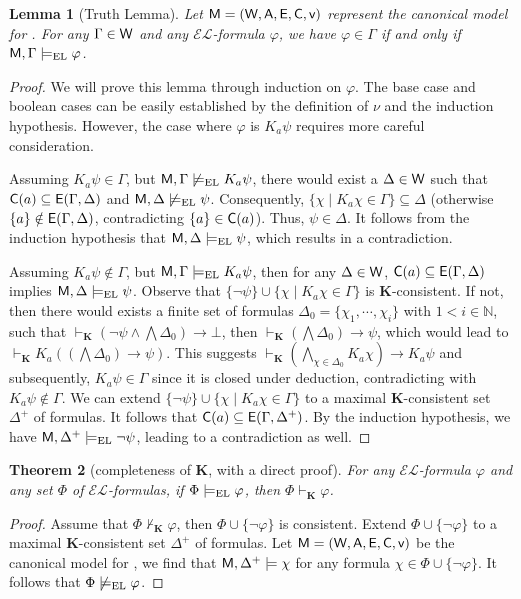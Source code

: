 \documentclass{article}
\newtheorem{theorem}{Theorem}
\newtheorem{lemma}[theorem]{Lemma}%
\newcommand{\CA}{\textnormal{\sf A}\xspace}
\newcommand{\CC}{\textnormal{\sf C}\xspace}
\newcommand{\CE}{\textnormal{\sf E}\xspace}
\newcommand{\CM}{\textnormal{\sf M}\xspace}
\newcommand{\CV}{\textnormal{\sf v}\xspace}
\newcommand{\CW}{\textnormal{\sf W}\xspace}
\renewcommand{\phi}{\varphi}
\newcommand{\ra}{\rightarrow}
\newcommand{\mbN}{\mathbb{N}}
\newcommand{\lang}{\ensuremath{\mathcal{EL}}\xspace}
\renewcommand{\l}{\text{\normalfont EL}\xspace}
\newcommand{\K}{\ensuremath{\mathbf{K}}\xspace}
\begin{document}
\begin{lemma}[Truth Lemma]\label{lem:truth-K}
Let $\CM=(\CW,\CA,\CE,\CC,\CV)$ represent the canonical model for \l. For any $\Gamma \in \CW$ and any \lang-formula $\phi$, we have $\phi \in \Gamma$ if and only if $\CM,\Gamma \models_{\l} \phi$.
\end{lemma}
\begin{proof}
We will prove this lemma through induction on $\phi$. The base case and boolean cases can be easily established by the definition of $\nu$ and the induction hypothesis. However, the case where $\phi$ is $K_a\psi$ requires more careful consideration.

Assuming $K_a\psi\in\Gamma$, but $\CM,\Gamma\not\models_\l K_a\psi$, there would exist a $\Delta\in \CW$ such that $\CC(a)\subseteq \CE (\Gamma,\Delta)$ and $\CM,\Delta\not\models_\l \psi$. Consequently, $\{\chi\mid K_a\chi\in\Gamma\}\subseteq\Delta$ (otherwise $\{a\} \notin \CE(\Gamma,\Delta)$, contradicting $\{a\} \in \CC(a)$). Thus, $\psi\in\Delta$. It follows from the induction hypothesis that $\CM,\Delta \models_\l \psi$, which results in a contradiction.

Assuming $K_a\psi\notin\Gamma$, but $\CM,\Gamma\models_\l K_a\psi$, then for any $\Delta\in \CW$, $\CC(a)\subseteq \CE (\Gamma,\Delta)$ implies $\CM,\Delta\models_\l \psi$. Observe that $\{\neg\psi\}\cup\{\chi\mid K_a\chi\in\Gamma\}$ is \K-consistent. If not, then there would exists a finite set of formulas $\Delta_0 = \{\chi_1,\cdots,\chi_i\}$ with $1<i\in\mbN$, such that $\vdash_\K (\neg\psi \wedge \bigwedge\Delta_0) \ra \bot$, then $\vdash_\K (\bigwedge\Delta_0) \ra\psi$, which would lead to $\vdash_\K K_a( (\bigwedge\Delta_0)\ra\psi)$. This suggests $\vdash_\K (\bigwedge_{\chi\in\Delta_0}K_a\chi)\ra K_a\psi$ and subsequently, $K_a\psi\in\Gamma$ since it is closed under deduction, contradicting with $K_a\psi\notin\Gamma$. We can extend $\{\neg\psi\}\cup\{\chi\mid K_a\chi\in\Gamma\}$ to a maximal \K-consistent set $\Delta^+$ of formulas. It follows that $\CC(a)\subseteq \CE(\Gamma,\Delta^+)$. By the induction hypothesis, we have $\CM,\Delta^+\models_\l \neg\psi$, leading to a contradiction as well.
\end{proof}

\begin{theorem}[completeness of \K, with a direct proof]
For any \lang-formula $\phi$ and any set $\Phi$ of \lang-formulas, if $\Phi \models_\l \phi$, then $\Phi \vdash_\K \phi$.
\end{theorem}
\begin{proof}
Assume that $\Phi \not\vdash_\K \phi$, then $\Phi\cup\{\neg\phi\}$ is consistent. Extend $\Phi\cup\{\neg\phi\}$ to a maximal \K-consistent set $\Delta^+$ of formulas. Let $\CM=(\CW,\CA,\CE,\CC,\CV)$ be the canonical model for \l, we find that $\CM,\Delta^+\models \chi$ for any formula $\chi\in \Phi\cup\{\neg\phi\}$. It follows that $\Phi \not\models_\l \phi$.
\end{proof}
\end{document}

